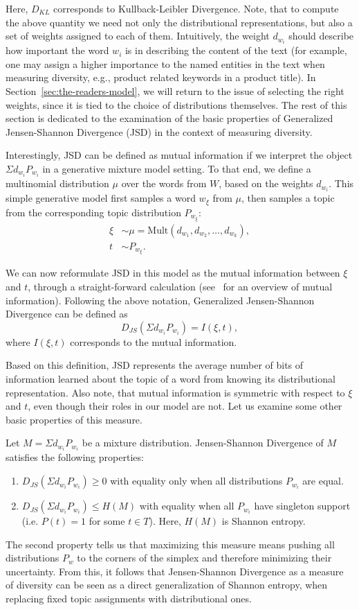 Here, $D_{KL}$ corresponds to Kullback-Leibler Divergence.
Note, that to compute the above quantity we need not only the
distributional representations, but also a set of weights assigned to
each of them. Intuitively, the weight $d_{w_i}$ should describe how
important the word $w_i$ is in describing the content of the text (for example, one may assign a higher importance  to the named entities in the text when measuring diversity, e.g., product related keywords in a product title). In
Section~\ref{sec:the-readers-model}, we will return to the issue of selecting the
right weights, since it is tied to the choice of distributions
themselves. The rest of this section is dedicated to the examination of the
basic properties of Generalized Jensen-Shannon Divergence (JSD) in the
context of measuring diversity. 

Interestingly, JSD can be defined as mutual information if we
interpret the object $\Sigma d_{w_i}P_{w_i}$ in a generative mixture
model setting. To that end, we define a multinomial distribution
$\mu$ over the words from $W$, based on the weights $d_{w_i}$. This
simple generative model first samples a word $w_\xi$ from $\mu$, then samples a
topic from the corresponding topic distribution $P_{w_\xi}$:
\begin{align*}
\xi &\sim \mu=\textrm{Mult}(d_{w_1},d_{w_2},\dots,d_{w_k}),\\
t &\sim P_{w_\xi}.
\end{align*}

We can now reformulate JSD in this model as the mutual information
between $\xi$ and $t$, through a straight-forward calculation
(see~\cite{Cover:2006:EIT:1146355} for an overview of mutual information).
\bep
Following the above notation, Generalized Jensen-Shannon Divergence
can be defined as
\[D_{JS}(\Sigma d_{w_i}P_{w_i})= I(\xi,t),\]
where $I(\xi,t)$ corresponds to the mutual information.
\eep

Based on this definition, JSD represents the average number of bits of
information learned about the topic of a word from knowing its
distributional representation. Also note, that mutual information is
symmetric with respect to $\xi$ and $t$, even though their roles in
our model are not. Let us examine some other basic properties of this
measure. 

\bep\label{jsd-properties}
Let $M=\Sigma d_{w_i} P_{w_i}$ be a mixture distribution. Jensen-Shannon
Divergence of $M$ satisfies the following properties:
 \begin{enumerate}
   \item $D_{JS}(\Sigma d_{w_i}P_{w_i})\geq 0$ with equality only when all
     distributions $P_{w_i}$ are equal.
   \item $D_{JS}(\Sigma d_{w_i}P_{w_i})\leq H(M)$ with equality when all
     $P_{w_i}$ have singleton support (i.e. $P(t)=1$ for some $t\in
     T$). Here, $H(M)$ is Shannon entropy.
 \end{enumerate}
\eep
The second property tells us that maximizing this measure means
pushing all distributions $P_w$ to the corners of the simplex and
therefore minimizing their uncertainty. From this, it follows that
Jensen-Shannon Divergence as a measure of diversity can be seen as a
direct generalization of Shannon entropy, when replacing fixed topic
assignments with distributional ones.  
